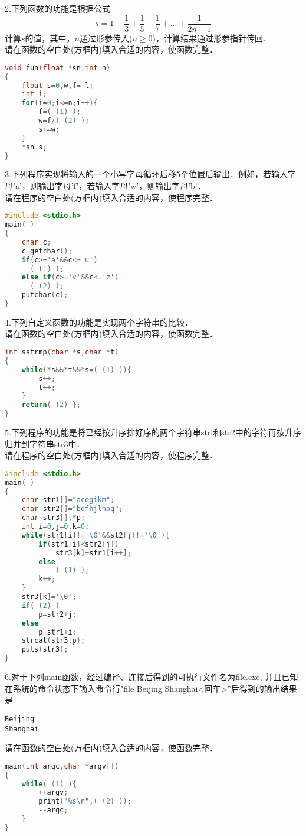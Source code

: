 2.下列函数的功能是根据公式
\begin{equation}
s=1-\frac{1}{3}+\frac{1}{5}-\frac{1}{7}+...+\frac{1}{2n+1}
\end{equation}
计算$s$的值，其中，$n$通过形参传入($n\geqslant0$)，计算结果通过形参指针传回． \\
请在函数的空白处(方框内)填入合适的内容，使函数完整．
\begin{lstlisting}[language=cpp]
void fun(float *sn,int n)
{
    float s=0,w,f=-l;
    int i;
    for(i=0;i<=n;i++){
        f=( (1) );
        w=f/( (2) );
        s+=w;
    }
    *sn=s;
}
\end{lstlisting}

3.下列程序实现将输入的一个小写字母循环后移5个位置后输出．例如，若输入字母'a'，则输出字母'f'，若输入字母'w'，则输出字母'b'． \\
请在程序的空白处(方框内)填入合适的内容，使程序完整．
\begin{lstlisting}[language=cpp]
#include <stdio.h>
main( )
{
    char c;
    c=getchar();
    if(c>='a'&&c<='u')
      ( (1) );
    else if(c>='v'&&c<='z')
      ( (2) );
    putchar(c);
}
\end{lstlisting}

4.下列自定义函数的功能是实现两个字符串的比较． \\
请在函数的空白处(方框内)填入合适的内容，使函数完整．
\begin{lstlisting}[language=cpp]
int sstrmp(char *s,char *t)
{
    while(*s&&*t&&*s=( (1) )){
        s++;
        t++;
    }
    return( (2) };
}
\end{lstlisting}

5.下列程序的功能是将已经按升序排好序的两个字符串strl和str2中的字符再按升序归并到字符串str3中． \\
请在程序的空白处(方框内)填入合适的内容，使程序完整．
\begin{lstlisting}[language=cpp]
#include <stdio.h>
main( )
{
    char str1[]="acegikm";
    char str2[]="bdfhjlnpq";
    char str3[],*p;
    int i=0,j=0,k=0;
    while(str1[i]!='\0'&&st2[j]!='\0'){
        if(str1[i]<str2[j])
            str3[k]=str1[i++];
        else
            ( (1) );
        k++;
    }
    str3[k]='\0';
    if( (2) )
        p=str2+j;
    else
        p=str1+i;
    strcat(str3,p);
    puts(str3);
}
\end{lstlisting}

6.对于下列main函数，经过编译、连接后得到的可执行文件名为file.exe, 并且已知在系统的命令状态下输入命令行"file Beijing Shanghai<回车>”后得到的输出结果是
\begin{lstlisting}
Beijing
Shanghai
\end{lstlisting}
请在函数的空白处(方框内)填入合适的内容，使函数完整．
\begin{lstlisting}[language=cpp]
main(int argc,char *argv[])
{
    while( (1) ){
        ++argv;
        print("%s\n",( (2) ));
        --argc;
    }
}
\end{lstlisting}


